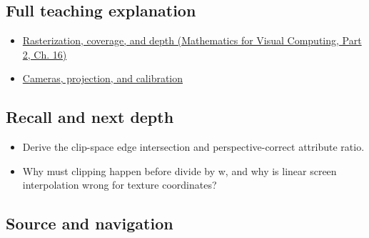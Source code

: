 \subsection{Full teaching explanation}\label{appendix-40426e4b2103-full-teaching-explanation}

\hypertarget{appendix-40426e4b2103-full-teaching-explanation}{}

\begin{itemize}
\tightlist
\item
  \href{../02-Mathematics-for-Visual-Computing-P02/main.pdf\#nameddest=03-visual-computing-i-ch012-rasterization-coverage-and-depth}{Rasterization, coverage, and depth (Mathematics for Visual Computing, Part 2, Ch. 16)}
\item
  \hyperref[03-visual-computing-i-ch003-cameras-projection-and-calibration]{Cameras, projection, and calibration}
\end{itemize}

\subsection{Recall and next depth}\label{appendix-40426e4b2103-recall-and-next-depth}

\hypertarget{appendix-40426e4b2103-recall-and-next-depth}{}

\begin{itemize}
\tightlist
\item
  Derive the clip-space edge intersection and perspective-correct attribute ratio.
\item
  Why must clipping happen before divide by w, and why is linear screen interpolation wrong for texture coordinates?
\end{itemize}

\subsection{Source and navigation}\label{appendix-40426e4b2103-source-and-navigation}

\hypertarget{appendix-40426e4b2103-source-and-navigation}{}

